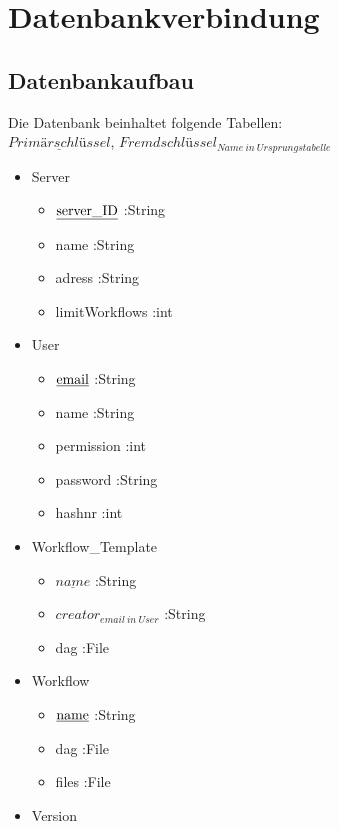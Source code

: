 \section{Datenbankverbindung}

\subsection{Datenbankaufbau}
Die Datenbank beinhaltet folgende Tabellen:\\
\textnormal{$\underline{Primärschlüssel}$},
\textnormal{$Fremdschlüssel_{Name\:in\:Ursprungstabelle}$}

\begin{itemize}
	\item Server
	\begin{itemize}
		\item $\textnormal{\underline{server\_ID}}$ :String
		\item name :String
		\item adress :String
		\item limitWorkflows :int
	\end{itemize}
	\item User
	\begin{itemize}
		\item $\textnormal{\underline{email}}$ :String
		\item name :String
		\item permission :int
		\item password :String
		\item hashnr :int
	\end{itemize}
	\item Workflow\_Template
	\begin{itemize}
		\item \textnormal{$\underline{name}$} :String
		\item \textnormal{$creator_{email\:in\:User}$} :String
		\item dag :File
	\end{itemize}
	\item Workflow
	\begin{itemize}
		\item $\textnormal{\underline{name}}$ :String
		\item dag :File
		\item files :File
	\end{itemize}
	\item Version
	\begin{itemize}

\end{itemize}
\end{itemize}
